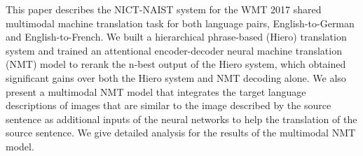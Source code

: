 This paper describes the NICT-NAIST system for the WMT 2017 shared multimodal machine translation task for both language pairs, English-to-German and English-to-French. We built a hierarchical phrase-based (Hiero) translation system and trained an attentional encoder-decoder neural machine translation (NMT) model to rerank the n-best output of the Hiero system, which obtained significant gains over both the Hiero system and NMT decoding alone. We also present a multimodal NMT model that integrates the target language descriptions of images that are similar to the image described by the source sentence as additional inputs of the neural networks to help the translation of the source sentence. We give detailed analysis for the results of the multimodal NMT model.
